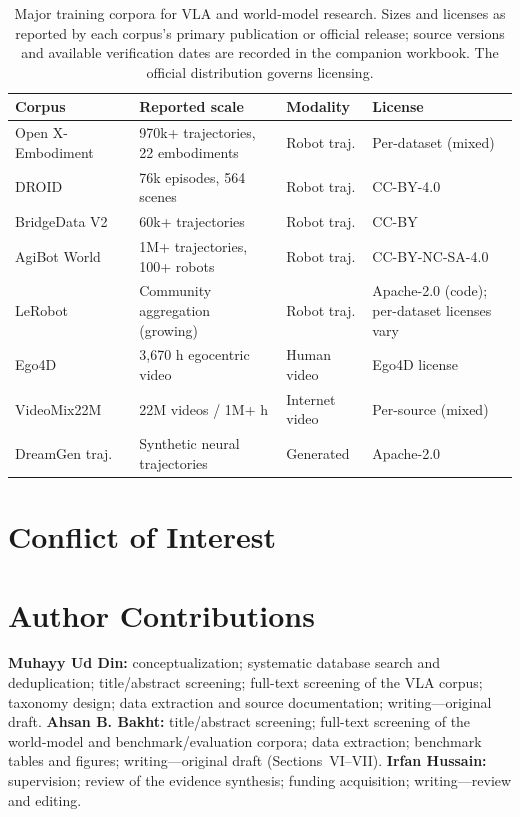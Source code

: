 \documentclass{ieeeaccess}
\begin{document}
\begin{table}[!t]
\caption{Major training corpora for VLA and world-model research. Sizes and
\textcolor[RGB]{104,48,148}{licenses as reported by each corpus's primary publication or official release; source versions and available verification dates are recorded in the companion workbook. The official distribution governs licensing.}}
\label{tab:datasets}
\centering
\scriptsize
\setlength{\tabcolsep}{3pt}
\begin{tabular}{p{2.1cm}p{2.2cm}p{1.4cm}p{1.35cm}}
\toprule
Corpus & Reported scale & Modality & License \\
\midrule
Open X-Embodiment~\cite{oxe} & 970k+ trajectories, 22 embodiments & Robot traj. & Per-dataset (mixed) \\
DROID~\cite{droid} & 76k episodes, 564 scenes & Robot traj. & CC-BY-4.0 \\
BridgeData V2~\cite{bridgedata} & 60k+ trajectories & Robot traj. & CC-BY \\
AgiBot World~\cite{agibotworld} & 1M+ trajectories, 100+ robots & Robot traj. & CC-BY-NC-SA-4.0 \\
LeRobot~\cite{cadene2026lerobot} & Community aggregation (growing) & Robot traj. & Apache-2.0 (code); per-dataset licenses vary \\
Ego4D~\cite{ego4d} & 3{,}670 h egocentric video & Human video & Ego4D license \\
VideoMix22M~\cite{vjepa2} & 22M videos / 1M+ h & Internet video & Per-source (mixed) \\
DreamGen traj.~\cite{dreamgen} & Synthetic neural trajectories & Generated & Apache-2.0 \\
\bottomrule
\end{tabular}
\end{table}

\section*{Conflict of Interest}


\section*{Author Contributions}
\textbf{Muhayy Ud Din:} conceptualization; systematic database search and
deduplication; title/abstract screening; full-text screening of the VLA
corpus; taxonomy design; data extraction and \textcolor[RGB]{104,48,148}{source documentation};
writing---original draft. \textbf{Ahsan B. Bakht:} title/abstract
screening; full-text screening of the world-model and benchmark/evaluation
corpora; data extraction; benchmark tables and figures; writing---original
draft (Sections~VI--VII).
\textbf{Irfan Hussain:} supervision;
\textcolor[RGB]{104,48,148}{review of the evidence synthesis}; funding acquisition;
writing---review and editing.
\end{document}
